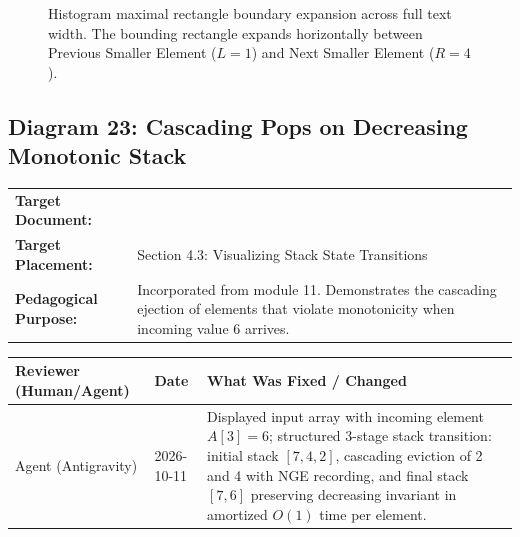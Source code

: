 \documentclass[11pt,a4paper]{article}
\newcommand{\breadcrumb}[3]{
    \par\vspace{0.15cm}
    \noindent\begin{tabularx}{\textwidth}{|l|X|}
    \hline
    \textbf{Target Document:} & \texttt{\detokenize{#1}} \\
    \textbf{Target Placement:} & #2 \\
    \textbf{Pedagogical Purpose:} & #3 \\
    \hline
    \end{tabularx}
    \vspace{0.15cm}\par
}
\newcommand{\diagramaudit}[3]{
    \par\vspace{0.12cm}
    \noindent\begin{tabularx}{\textwidth}{|l|l|>{\raggedright\arraybackslash}X|}
    \hline
    \textbf{Reviewer (Human/Agent)} & \textbf{Date} & \textbf{What Was Fixed / Changed} \\ \hline
    #1 & #2 & #3 \\ \hline
    \end{tabularx}
    \vspace{0.12cm}\par
}
\begin{document}
\begin{figure}[htbp]
\caption{Histogram maximal rectangle boundary expansion across full text width. The bounding rectangle expands horizontally between Previous Smaller Element ($L=1$) and Next Smaller Element ($R=4$).}
\end{figure}

\newpage
\subsection{Diagram 23: Cascading Pops on Decreasing Monotonic Stack}

\breadcrumb{11.monotonic_stacks_and_queues.tex}{Section 4.3: Visualizing Stack State Transitions}{Incorporated from module 11. Demonstrates the cascading ejection of elements that violate monotonicity when incoming value 6 arrives.}

\diagramaudit{Agent (Antigravity)}{2026-10-11}{Displayed input array with incoming element $A[3]=6$; structured 3-stage stack transition: initial stack $[7, 4, 2]$, cascading eviction of 2 and 4 with NGE recording, and final stack $[7, 6]$ preserving decreasing invariant in amortized $O(1)$ time per element.}
\end{document}
